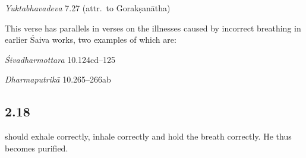 \begin{ekdosis}
\begin{testimonia}[hp02_017]
\begin{versinnote}
\end{versinnote}

\emph{Yuktabhavadeva} 7.27 (attr.~to Gorakṣanātha)
\begin{versinnote}
\end{versinnote}

\end{testimonia}

\begin{philcomm}[hp02_017]
This verse has parallels in verses on the illnesses caused by incorrect breathing in earlier Śaiva works, two examples of which are:

\emph{Śivadharmottara} 10.124cd–125
\begin{versinnote}
\end{versinnote}

\emph{Dharmaputrikā} 10.265–266ab
\begin{versinnote}
\end{versinnote}

\end{philcomm}


\subsection*{2.18}
\begin{translation} should exhale correctly, inhale correctly and hold the breath correctly. He thus becomes purified.
\end{translation}


\end{ekdosis}
